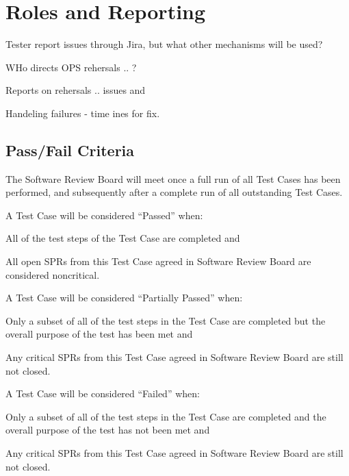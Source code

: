 




\section{Roles and Reporting}

Tester report issues through Jira, but what other mechanisms will be used?

WHo directs OPS rehersals .. ?

Reports on rehersals .. issues and 


Handeling failures - time ines for fix. 


\subsection{Pass/Fail Criteria}

The Software Review Board will meet once a full run of all Test Cases has been performed, and subsequently after a complete run of all outstanding Test Cases.

A Test Case will be considered ``Passed'' when:
\begin{itemize_single}
\item All of the test steps of the Test Case are completed and
\item All open SPRs from this Test Case agreed in Software Review Board are considered noncritical.
\end{itemize_single}

A Test Case will be considered ``Partially Passed'' when:
\begin{itemize_single}
\item Only a subset of all of the test steps in the Test Case are completed but the overall purpose of the test has been met and
\item Any critical SPRs from this Test Case agreed in Software Review Board are still not closed.
\end{itemize_single}

A Test Case will be considered ``Failed'' when:
\begin{itemize_single}
\item Only a subset of all of the test steps in the Test Case are completed and the overall purpose of the test has not been met and
\item Any critical SPRs from this Test Case agreed in Software Review Board are still not closed.
\end{itemize_single}

